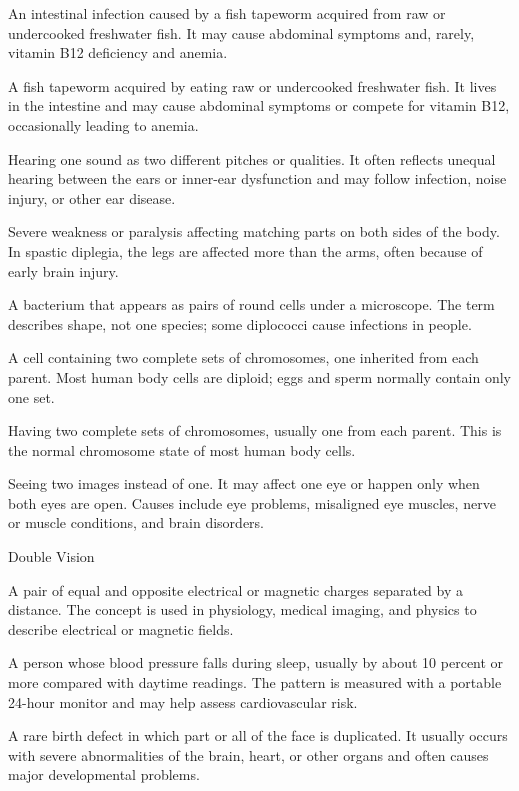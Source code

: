  An intestinal infection caused by a fish tapeworm acquired from raw or undercooked freshwater fish. It may cause abdominal symptoms and, rarely, vitamin B12 deficiency and anemia.

 A fish tapeworm acquired by eating raw or undercooked freshwater fish. It lives in the intestine and may cause abdominal symptoms or compete for vitamin B12, occasionally leading to anemia.

 Hearing one sound as two different pitches or qualities. It often reflects unequal hearing between the ears or inner-ear dysfunction and may follow infection, noise injury, or other ear disease.

 Severe weakness or paralysis affecting matching parts on both sides of the body. In spastic diplegia, the legs are affected more than the arms, often because of early brain injury.

 A bacterium that appears as pairs of round cells under a microscope. The term describes shape, not one species; some diplococci cause infections in people.

 A cell containing two complete sets of chromosomes, one inherited from each parent. Most human body cells are diploid; eggs and sperm normally contain only one set.

 Having two complete sets of chromosomes, usually one from each parent. This is the normal chromosome state of most human body cells.

 Seeing two images instead of one. It may affect one eye or happen only when both eyes are open. Causes include eye problems, misaligned eye muscles, nerve or muscle conditions, and brain disorders.

\synonyms
Double Vision

 A pair of equal and opposite electrical or magnetic charges separated by a distance. The concept is used in physiology, medical imaging, and physics to describe electrical or magnetic fields.

 A person whose blood pressure falls during sleep, usually by about 10 percent or more compared with daytime readings. The pattern is measured with a portable 24-hour monitor and may help assess cardiovascular risk.

 A rare birth defect in which part or all of the face is duplicated. It usually occurs with severe abnormalities of the brain, heart, or other organs and often causes major developmental problems.

